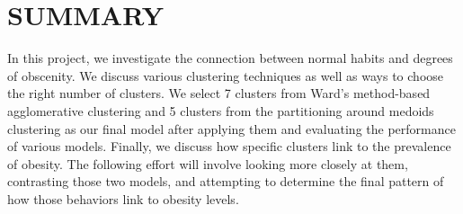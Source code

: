 \section{SUMMARY}
In this project, we investigate the connection between normal habits and degrees of obscenity. We discuss various clustering techniques as well as ways to choose the right number of clusters. We select 7 clusters from Ward's method-based agglomerative clustering and 5 clusters from the partitioning around medoids clustering as our final model after applying them and evaluating the performance of various models. Finally, we discuss how specific clusters link to the prevalence of obesity. The following effort will involve looking more closely at them, contrasting those two models, and attempting to determine the final pattern of how those behaviors link to obesity levels.